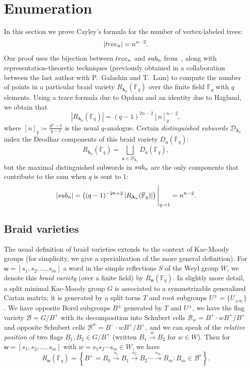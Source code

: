 \documentclass[a4paper,10pt,leqno]{amsart}
\newcommand{\darkred}{\color{darkred}}
\numberwithin{equation}{section}
\newtheorem{proposition}[theorem]{Proposition}
\theoremstyle{definition}
\theoremstyle{remark}
\newcommand{\w}{\mathsf{w}}
\renewcommand{\u}{\mathsf{u}}
\newcommand{\T}{\textsc{tree}}
\renewcommand{\S}{\textsc{sub}}
\newcommand{\E}{\T}
\newcommand{\FF}{\mathbb{F}}
\newcommand{\blambda}{\bm{\lambda}}
\newcommand{\defn}[1]{\emph{\darkred #1}}
\begin{document}





\section{Enumeration}
\label{sec:details}
In this section we prove Cayley's formula for the number of vertex-labeled trees:
\[\left|\E_n\right|=n^{n-2}.\]
Our proof uses the bijection between $\E_n$ and $\S_n$ from~, along with representation-theoretic techniques (previously obtained in a collaboration between the last author with P.~Galashin and T.~Lam) to compute the number of points in a particular braid variety $R_{\blambda_n}(\FF_q)$ over the finite field $\FF_q$ with $q$ elements.  Using a trace formula due to Opdam and an identity due to Haglund, we obtain that
\[\left|R_{\blambda_n}(\FF_q)\right|=(q-1)^{2n-2} [n]_q^{n-2},\]
where $[n]_q\coloneqq\frac{q^{n}-1}{q-1}$ is the usual $q$-analogue.
Certain \emph{distinguished subwords} $\mathcal{D}_{\blambda_n}$ index the Deodhar components of this braid variety $D_\u(\FF_q)$:
\[R_{\blambda_n}(\FF_q) = \bigsqcup_{\u \in \mathcal{D}_{\blambda_n}} D_\u(\FF_q),\]
but the maximal distinguished subwords in $\S_n$ are the only components that contribute to the sum when $q$ is sent to $1$:
\[|\S_n| = \left((q-1)^{-2n+2} \left|R_{\blambda_n}(\FF_q)\right|\right)\Bigg|_{q\to 1} = n^{n-2}.\]


\subsection{Braid varieties}
\label{sec:braid_varieties}
The usual definition of braid varieties extends to the context of Kac-Moody groups (for simplicity, we give a specialization of the more general definition).  For $\w = [s_1,s_2,\ldots, s_m]$ a word in the simple reflections $S$ of the Weyl group $W$, we denote this \defn{braid variety} (over a finite field) by $R_{\w}(\FF_q)$.  In slightly more detail, a split minimal Kac-Moody group $G$ is associated to a symmetrizable generalized Cartan matrix; it is generated by a split torus $T$ and root subgroups $U^\pm = \{U_{\pm \alpha_i}\}$.  We have opposite Borel subgroups $B^\pm$ generated by $T$ and $U^\pm$, we have the flag variety $\mathcal{B} = G/B^+$ with its decomposition into Schubert cells $\mathcal{B}_w = B^+ \cdot{w} B^+/B^+$ and opposite Schubert cells $\mathcal{B}^w = B^- \cdot{w} B^+/B^+$, and we can speak of the \defn{relative position} of two flags $B_1,B_2 \in G/B^+$ (written $B_1 \xrightarrow{w} B_2$ for $w \in W$).  Then for $\w = [s_1,s_2,\ldots, s_m]$ with $w = s_1s_2 \cdots s_m \in W$, we have
\[R_{\w}(\FF_q) = \left\{ B^+=B_0 \xrightarrow{s_1} B_1 \xrightarrow{s_2} B_2 \cdots \xrightarrow{s_m} B_m : B_m \in \mathcal{B}^e \right\}.\]
\end{document}
